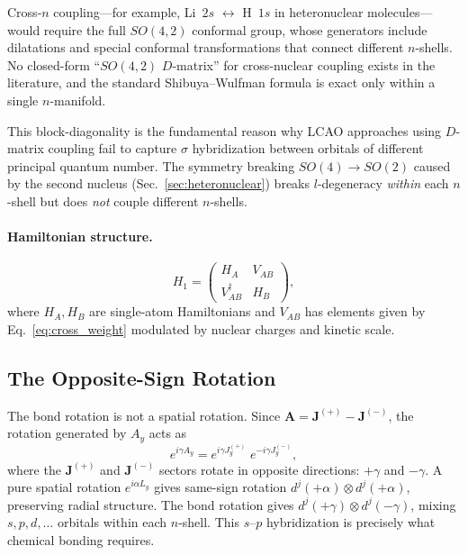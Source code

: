 \documentclass[aps,pra,twocolumn,superscriptaddress,longbibliography]{revtex4-2}
\begin{document}
Cross-$n$ coupling---for example, Li~$2s$ $\leftrightarrow$ H~$1s$ in
heteronuclear molecules---would require the full $SO(4,2)$ conformal
group, whose generators include dilatations and special conformal
transformations that connect different $n$-shells.  No closed-form
``$SO(4,2)$ $D$-matrix'' for cross-nuclear coupling exists in the
literature, and the standard Shibuya--Wulfman formula is exact only
within a single $n$-manifold.

This block-diagonality is the fundamental reason why LCAO approaches
using $D$-matrix coupling fail to capture $\sigma$ hybridization between
orbitals of different principal quantum number.  The symmetry breaking
$SO(4) \to SO(2)$ caused by the second nucleus
(Sec.~\ref{sec:heteronuclear}) breaks $l$-degeneracy \emph{within} each
$n$-shell but does \emph{not} couple different $n$-shells.

\paragraph{Hamiltonian structure.}
\begin{equation}
H_1 = \begin{pmatrix} H_A & V_{AB} \\ V_{AB}^\dagger & H_B \end{pmatrix},
\label{eq:H1_block}
\end{equation}
where $H_A, H_B$ are single-atom Hamiltonians and $V_{AB}$ has elements
given by Eq.~\eqref{eq:cross_weight} modulated by nuclear charges and
kinetic scale.

\subsection{The Opposite-Sign Rotation}
\label{sec:opposite_sign}

The bond rotation is not a spatial rotation.  Since
$\mathbf{A} = \mathbf{J}^{(+)} - \mathbf{J}^{(-)}$, the rotation
generated by $A_y$ acts as
\begin{equation}
e^{i\gamma A_y}
= e^{i\gamma J^{(+)}_y}\; e^{-i\gamma J^{(-)}_y},
\label{eq:opposite_sign}
\end{equation}
where the $\mathbf{J}^{(+)}$ and $\mathbf{J}^{(-)}$ sectors rotate in
opposite directions: $+\gamma$ and $-\gamma$.  A pure spatial rotation
$e^{i\alpha L_y}$ gives same-sign rotation $d^j(+\alpha) \otimes
d^j(+\alpha)$, preserving radial structure.  The bond rotation gives
$d^j(+\gamma) \otimes d^j(-\gamma)$, mixing $s, p, d, \ldots$
orbitals within each $n$-shell.  This $s$--$p$ hybridization is
precisely what chemical bonding requires.
\end{document}
